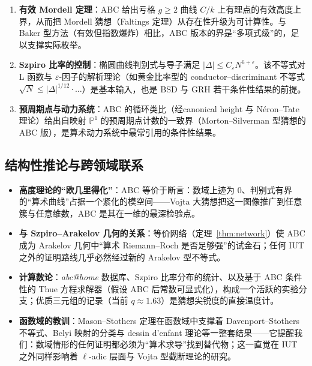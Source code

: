 \begin{enumerate}[label=(\arabic*)]
    \item \textbf{有效 Mordell 定理}：ABC 给出亏格 $g \geq 2$ 曲线 $C/k$ 上有理点的有效高度上界\cite{elkies1991}，从而把 Mordell 猜想（Faltings 定理）从存在性升级为可计算性。与 Baker 型方法（有效但指数爆炸）相比，ABC 版本的界是“多项式级”的，足以支撑实际枚举。
    \item \textbf{Szpiro 比率的控制}：椭圆曲线判别式与导子满足 $|\Delta| \leq C_\varepsilon N^{6+\varepsilon}$。该不等式对 L 函数与 $\varepsilon$-因子的解析理论（如黄金比率型的 conductor--discriminant 不等式 $\sqrt{N} \leq |\Delta|^{1/12} \cdot \ldots$）是基本输入，也是 BSD 与 GRH 若干条件性结果的前提。
    \item \textbf{预周期点与动力系统}：ABC 的循环类比（经canonical height 与 N\'eron--Tate 理论）给出自映射 $\mathbb{P}^1$ 的预周期点计数的一致界（Morton--Silverman 型猜想的 ABC 版），是算术动力系统中最常引用的条件性结果。
\end{enumerate}

\subsection{结构性推论与跨领域联系}

\begin{itemize}
    \item \textbf{高度理论的“欧几里得化”}：ABC 等价于断言：数域上迹为 $0$、判别式有界的“算术曲线”占据一个紧化的模空间——Vojta 大猜想把这一图像推广到任意簇与任意维数，ABC 是其在一维的最深检验点。
    \item \textbf{与 Szpiro--Arakelov 几何的关系}：等价网络（定理~\ref{thm:network}）使 ABC 成为 Arakelov 几何中“算术 Riemann--Roch 是否足够强”的试金石；任何 IUT 之外的证明路线几乎必然经过新的 Arakelov 型不等式。
    \item \textbf{计算数论}：\textit{abc@home} 数据库、Szpiro 比率分布的统计、以及基于 ABC 条件性的 Thue 方程求解器（假设 ABC 后常数可显式化），构成一个活跃的实验分支；优质三元组的记录（当前 $q \approx 1.63$）是猜想尖锐度的直接温度计。
    \item \textbf{函数域的教训}：Mason--Stothers 定理在函数域中支撑着 Davenport--Stothers 不等式、Belyi 映射的分类与 dessin d'enfant 理论等一整套结果——它提醒我们：数域情形的任何证明都必须为“算术求导”找到替代物；这一直觉在 IUT 之外同样影响着 $\ell$-adic 层面与 Vojta 型截断理论的研究。
\end{itemize}
